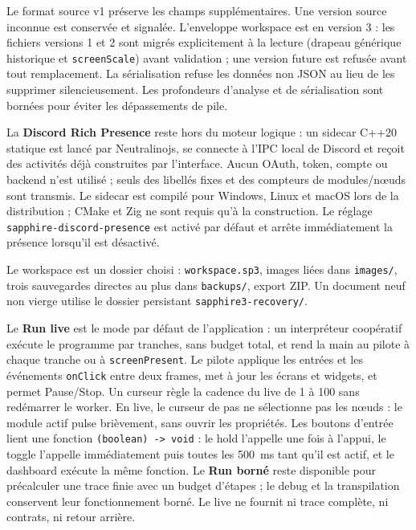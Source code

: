 \documentclass[11pt,a4paper]{article}
\newcommand{\code}[1]{\texttt{#1}}
\begin{document}
Le format source v1 préserve les champs supplémentaires. Une version source
inconnue est conservée et signalée. L'enveloppe workspace est en version 3 : les
fichiers versions 1 et 2 sont migrés explicitement à la lecture (drapeau générique
historique et \code{screenScale}) avant validation ; une version future est
refusée avant tout remplacement. La sérialisation refuse les données non JSON au
lieu de les supprimer silencieusement. Les profondeurs d'analyse et de
sérialisation sont bornées pour éviter les dépassements de pile.

La \textbf{Discord Rich Presence} reste hors du moteur logique : un sidecar C++20
statique est lancé par Neutralinojs, se connecte à l'IPC local de Discord et
reçoit des activités déjà construites par l'interface. Aucun OAuth, token,
compte ou backend n'est utilisé ; seuls des libellés fixes et des compteurs de
modules/nœuds sont transmis. Le sidecar est compilé pour Windows, Linux et macOS
lors de la distribution ; CMake et Zig ne sont requis qu'à la construction. Le
réglage \code{sapphire-discord-presence} est activé par défaut et arrête
immédiatement la présence lorsqu'il est désactivé.

Le workspace est un dossier choisi : \code{workspace.sp3}, images liées dans
\code{images/}, trois sauvegardes directes au plus dans \code{backups/}, export ZIP.
Un document neuf non vierge utilise le dossier persistant \code{sapphire3-recovery/}.

Le \textbf{Run live} est le mode par défaut de l'application : un interpréteur
coopératif exécute le programme par tranches, sans budget total, et rend la main
au pilote à chaque tranche ou à \code{screenPresent}. Le pilote applique les entrées
et les événements \code{onClick} entre deux frames, met à jour les écrans et widgets,
et permet Pause/Stop. Un curseur règle la cadence du live de 1 à 100 sans redémarrer
le worker. En live, le curseur de pas ne sélectionne pas les nœuds : le module actif
pulse brièvement, sans ouvrir les propriétés. Les boutons d'entrée lient une fonction
\code{(boolean) -> void} :
le hold l'appelle une fois à l'appui, le toggle l'appelle immédiatement puis toutes
les 500~ms tant qu'il est actif, et le dashboard exécute la même fonction. Le
\textbf{Run borné} reste disponible pour précalculer une trace finie avec un budget
d'étapes ; le debug et la transpilation conservent leur fonctionnement borné.
Le live ne fournit ni trace complète, ni contrats, ni retour arrière.
\end{document}
